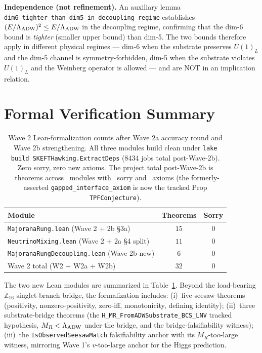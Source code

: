 \documentclass[aps,prd,twocolumn,showpacs,superscriptaddress,nofootinbib]{revtex4-2}
\newcommand{\HeavyMaj}{M_R}
\newcommand{\LambdaADW}{\Lambda_{\rm ADW}}
\begin{document}
\textbf{Independence (not refinement).} An auxiliary lemma
\texttt{dim6\_tighter\_than\_dim5\_in\_decoupling\_regime} establishes
$(E/\LambdaADW)^2 \le E/\LambdaADW$ in the decoupling regime, confirming that
the dim-6 bound is \emph{tighter} (smaller upper bound) than dim-5. The two
bounds therefore apply in different physical regimes — dim-6 when the substrate
preserves $U(1)_L$ and the dim-5 channel is symmetry-forbidden, dim-5 when the
substrate violates $U(1)_L$ and the Weinberg operator is allowed — and are NOT
in an implication relation.

\section{Formal Verification Summary}
\label{sec:formal-verification}

\begin{table}[t]
\centering
\begin{tabular}{lcc}
\toprule
Module & Theorems & Sorry \\
\midrule
\texttt{MajoranaRung.lean} (Wave 2 + 2b §3a) & $15$ & $0$ \\
\texttt{NeutrinoMixing.lean} (Wave 2 + 2a §4 split) & $11$ & $0$ \\
\texttt{MajoranaRungDecoupling.lean} (Wave 2b new) & $6$ & $0$ \\
\midrule
Wave 2 total (W2 + W2a + W2b) & $32$ & $0$ \\
\bottomrule
\end{tabular}
\caption{Wave 2 Lean-formalization counts after Wave 2a accuracy round
and Wave 2b strengthening. All three modules build clean under
\texttt{lake build SKEFTHawking.ExtractDeps} (8434 jobs total
post-Wave-2b). Zero sorry, zero new axioms. The project total
post-Wave-2b is \totaltheorems\ theorems across \leanmodules\
modules with \sorrycount\ sorry and \axiomcount\ axioms
(the formerly-asserted \texttt{gapped\_interface\_axiom} is now the
tracked Prop \texttt{TPFConjecture}).}
\label{tab:formal-summary}
\end{table}

The two new Lean modules are summarized in Table~\ref{tab:formal-summary}.
Beyond the load-bearing $\mathbb{Z}_{16}$ singlet-branch bridge,
the formalization includes: (i)~five seesaw theorems (positivity,
nonzero-positivity, zero-iff, monotonicity, defining identity);
(ii)~three substrate-bridge theorems (the \texttt{H\_MR\_FromADWSubstrate\_BCS\_LNV}
tracked hypothesis, $\HeavyMaj < \LambdaADW$ under the bridge,
and the bridge-falsifiability witness); (iii)~the
\texttt{IsObservedSeesawMatch} falsifiability anchor with its
$M_R$-too-large witness, mirroring Wave 1's $v$-too-large anchor for
the Higgs prediction.
\end{document}
